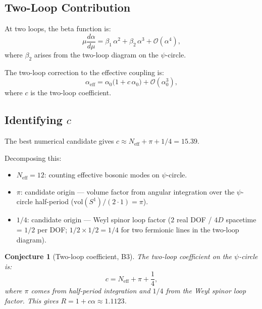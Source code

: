 \documentclass[11pt,a4paper]{article}
\newtheorem{conjecture}{Conjecture}
\theoremstyle{remark}
\begin{document}
\subsection{Two-Loop Contribution}

At two loops, the beta function is:
\begin{equation}
  \mu\frac{d\alpha}{d\mu}
    = \beta_1\,\alpha^2 + \beta_2\,\alpha^3 + \mathcal{O}(\alpha^4),
  \label{eq:two_loop_beta}
\end{equation}
where $\beta_2$ arises from the two-loop diagram on the $\psi$-circle.

The two-loop correction to the effective coupling is:
\begin{equation}
  \alpha_{\mathrm{eff}}
    = \alpha_0\bigl(1 + c\,\alpha_0\bigr) + \mathcal{O}(\alpha_0^3),
  \label{eq:alpha_two_loop}
\end{equation}
where $c$ is the two-loop coefficient.

\subsection{Identifying $c$}

The best numerical candidate gives $c \approx N_{\mathrm{eff}} + \pi + 1/4 = 15.39$.

Decomposing this:
\begin{itemize}
  \item $N_{\mathrm{eff}} = 12$: counting effective bosonic modes on $\psi$-circle.
  \item $\pi$: candidate origin — volume factor from angular integration over
    the $\psi$-circle half-period ($\mathrm{vol}(S^1)/(2\cdot 1) = \pi$).
  \item $1/4$: candidate origin — Weyl spinor loop factor
    ($2$ real DOF / $4D$ spacetime = $1/2$ per DOF; $1/2 \times 1/2 = 1/4$
    for two fermionic lines in the two-loop diagram).
\end{itemize}

\begin{conjecture}[Two-loop coefficient, B3]
\label{conj:two_loop}
The two-loop coefficient on the $\psi$-circle is:
\begin{equation}
  c = N_{\mathrm{eff}} + \pi + \frac{1}{4},
  \label{eq:c_conjecture}
\end{equation}
where $\pi$ comes from half-period integration and $1/4$ from the Weyl
spinor loop factor.  This gives $R = 1 + c\alpha \approx 1.1123$.
\end{conjecture}
\end{document}

